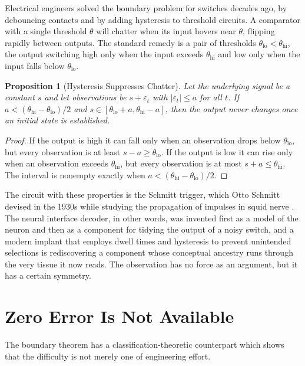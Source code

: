 \documentclass[11pt,twoside,openany]{book}
\newtheorem{proposition}[theorem]{Proposition}
\theoremstyle{definition}
\theoremstyle{remark}
\begin{document}
Electrical engineers solved the boundary problem for switches decades ago, by debouncing contacts and by adding hysteresis to threshold circuits. A comparator with a single threshold $\theta$ will chatter when its input hovers near $\theta$, flipping rapidly between outputs. The standard remedy is a pair of thresholds $\theta_{\mathrm{lo}}<\theta_{\mathrm{hi}}$, the output switching high only when the input exceeds $\theta_{\mathrm{hi}}$ and low only when the input falls below $\theta_{\mathrm{lo}}$.

\begin{proposition}[Hysteresis Suppresses Chatter]\label{prop:hyst}
Let the underlying signal be a constant $s$ and let observations be $s+\varepsilon_t$ with $|\varepsilon_t|\le a$ for all $t$. If $a<(\theta_{\mathrm{hi}}-\theta_{\mathrm{lo}})/2$ and $s\in[\theta_{\mathrm{lo}}+a,\theta_{\mathrm{hi}}-a]$, then the output never changes once an initial state is established.
\end{proposition}
\begin{proof}
If the output is high it can fall only when an observation drops below $\theta_{\mathrm{lo}}$, but every observation is at least $s-a\ge\theta_{\mathrm{lo}}$. If the output is low it can rise only when an observation exceeds $\theta_{\mathrm{hi}}$, but every observation is at most $s+a\le\theta_{\mathrm{hi}}$. The interval is nonempty exactly when $a<(\theta_{\mathrm{hi}}-\theta_{\mathrm{lo}})/2$.
\end{proof}

The circuit with these properties is the Schmitt trigger, which Otto Schmitt devised in the 1930s while studying the propagation of impulses in squid nerve \cite{schmitt1938}. The neural interface decoder, in other words, was invented first as a model of the neuron and then as a component for tidying the output of a noisy switch, and a modern implant that employs dwell times and hysteresis to prevent unintended selections is rediscovering a component whose conceptual ancestry runs through the very tissue it now reads. The observation has no force as an argument, but it has a certain symmetry.

\section{Zero Error Is Not Available}

The boundary theorem has a classification-theoretic counterpart which shows that the difficulty is not merely one of engineering effort.
\end{document}
